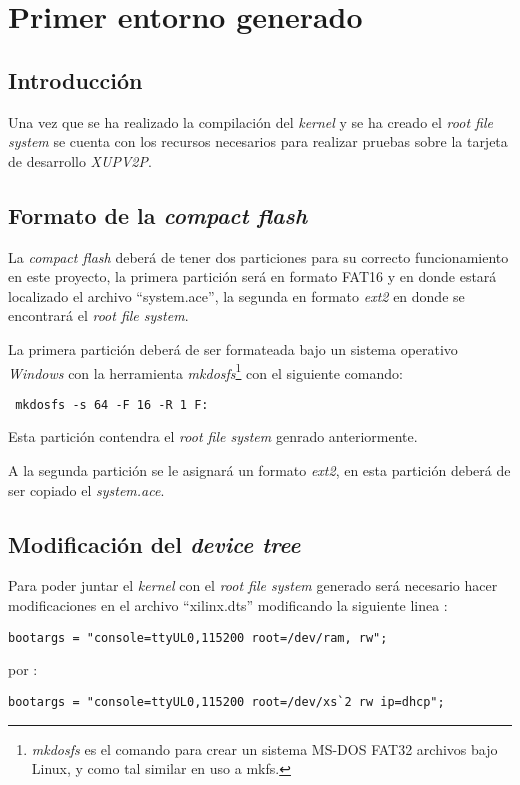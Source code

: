 \chapter{Primer entorno generado}

\section{Introducción}

Una vez que se ha realizado la compilación del \emph{kernel} y se ha creado el
\emph{root file system} se cuenta con los recursos necesarios para realizar
pruebas sobre la tarjeta de desarrollo \emph{XUPV2P}.

\section{Formato de la \emph{compact flash}}

La \emph{compact flash}  deberá de tener  dos particiones para su correcto
funcionamiento en este proyecto, la primera partición será en formato FAT16 y en
donde estará localizado el archivo ``system.ace'', la segunda en formato
\emph{ext2} en donde se encontrará el \emph{root file system}.

La primera partición deberá de ser formateada bajo un sistema operativo
\emph{Windows} con la herramienta \emph{mkdosfs}\footnote{\emph{mkdosfs} es el
comando para crear un sistema MS-DOS FAT32 archivos bajo Linux, y como tal
similar en uso a mkfs.} con el siguiente comando:

\begin{verbatim}
 mkdosfs -s 64 -F 16 -R 1 F:
\end{verbatim}

Esta partición contendra el \emph{root file system} genrado anteriormente.

A la segunda partición se le asignará un formato \emph{ext2}, en esta partición
deberá de ser copiado el \emph{system.ace}.

\section{Modificación del \emph{device tree}}

Para poder juntar el \emph{kernel} con el \emph{root file system} generado será
necesario hacer modificaciones en el archivo ``xilinx.dts''  modificando la
siguiente linea  :

\begin{lstlisting}[caption=Archivo ``xilinx.dts'' ]
		bootargs = "console=ttyUL0,115200 root=/dev/ram, rw";
\end{lstlisting}
por :
\begin{lstlisting}[caption=``xilinx.dts'' ]
		bootargs = "console=ttyUL0,115200 root=/dev/xs`2 rw ip=dhcp";
\end{lstlisting}

